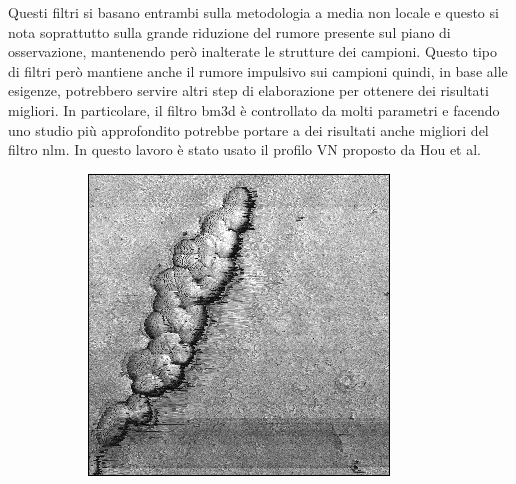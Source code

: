 \documentclass[../main.tex]{subfiles}
\begin{document}
Questi filtri si basano entrambi sulla metodologia a media non locale e questo si nota soprattutto sulla grande riduzione del rumore presente sul piano di osservazione, mantenendo però inalterate le strutture dei campioni. Questo tipo di filtri però mantiene anche il rumore impulsivo sui campioni quindi, in base alle esigenze, potrebbero servire altri step di elaborazione per ottenere dei risultati migliori. In particolare, il filtro \acrshort{bm3d} è controllato da molti parametri e facendo uno studio più approfondito potrebbe portare a dei risultati anche migliori del filtro \acrshort{nlm}. In questo lavoro è stato usato il profilo VN proposto da Hou et al.\cite{hou_2011}

\newpage
\null
\begin{figure}[!ht]
	\centering
	\begin{subfigure}{0.3\linewidth}
		\centering
		\includegraphics[keepaspectratio, width=\linewidth]{images/ef_o2a_orig.png}
	\end{subfigure}
	\hfill
	\begin{subfigure}{0.3\linewidth}
		\centering

\end{subfigure}
\end{figure}
\end{document}
